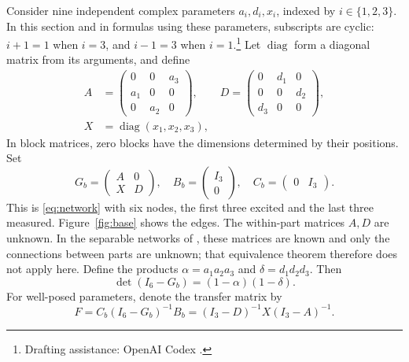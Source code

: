 \documentclass[letterpaper,10pt,conference]{ieeeconf}
\newcommand{\diag}{\operatorname{diag}}
\newcommand{\aicite}{\footnote{Drafting assistance: OpenAI Codex \cite{codex}.}\space}
\begin{document}
Consider nine independent complex parameters \(a_i,d_i,x_i\), indexed by
\(i\in\{1,2,3\}\). In this section and in formulas using these parameters,
subscripts are cyclic: \(i+1=1\) when \(i=3\), and \(i-1=3\) when \(i=1\).\aicite
Let \(\diag\) form a diagonal matrix from its arguments, and define
\begin{equation}\label{eq:blocks}
\begin{split}
 A&=\begin{pmatrix}0&0&a_3\\a_1&0&0\\0&a_2&0\end{pmatrix},\qquad
 D=\begin{pmatrix}0&d_1&0\\0&0&d_2\\d_3&0&0\end{pmatrix},\\
 X&=\diag(x_1,x_2,x_3),
\end{split}
\end{equation}
In block matrices, zero blocks have the dimensions determined by their
positions. Set
\begin{equation}\label{eq:base}
 G_b=\begin{pmatrix}A&0\\X&D\end{pmatrix},\quad
 B_b=\begin{pmatrix}I_3\\0\end{pmatrix},\quad
 C_b=\begin{pmatrix}0&I_3\end{pmatrix}.
\end{equation}
This is \eqref{eq:network} with six nodes, the first three excited and
the last three measured. Figure~\ref{fig:base} shows the edges.
The within-part matrices \(A,D\) are unknown. In the separable
networks of \cite{LH23}, these matrices are known and only the
connections between parts are unknown; that equivalence theorem
therefore does not apply here.
Define the products \(\alpha=a_1a_2a_3\) and
\(\delta=d_1d_2d_3\). Then
\[
 \det(I_6-G_b)=(1-\alpha)(1-\delta).
\]
For well-posed parameters, denote the transfer matrix by
\begin{equation}\label{eq:F}
 F=C_b(I_6-G_b)^{-1}B_b=(I_3-D)^{-1}X(I_3-A)^{-1}.
\end{equation}
\end{document}
